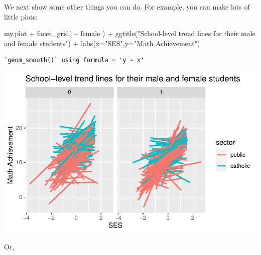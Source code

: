 \documentclass[
  letterpaper,
  DIV=11,
  numbers=noendperiod]{scrreprt}
\newenvironment{Shaded}{}{}
\newcommand{\AttributeTok}[1]{\textcolor[rgb]{0.49,0.56,0.16}{#1}}
\newcommand{\FunctionTok}[1]{\textcolor[rgb]{0.02,0.16,0.49}{#1}}
\newcommand{\NormalTok}[1]{#1}
\newcommand{\SpecialCharTok}[1]{\textcolor[rgb]{0.25,0.44,0.63}{#1}}
\newcommand{\StringTok}[1]{\textcolor[rgb]{0.25,0.44,0.63}{#1}}
\begin{document}
We next show some other things you can do. For example, you can make
lots of little plots:

\begin{Shaded}
\begin{Highlighting}[]
\NormalTok{my.plot }\SpecialCharTok{+} 
  \FunctionTok{facet\_grid}\NormalTok{( }\SpecialCharTok{\textasciitilde{}}\NormalTok{ female ) }\SpecialCharTok{+} 
    \FunctionTok{ggtitle}\NormalTok{(}\StringTok{"School{-}level trend lines for their male and female students"}\NormalTok{) }\SpecialCharTok{+}
    \FunctionTok{labs}\NormalTok{(}\AttributeTok{x=}\StringTok{"SES"}\NormalTok{,}\AttributeTok{y=}\StringTok{"Math Achievement"}\NormalTok{) }
\end{Highlighting}
\end{Shaded}

\begin{verbatim}
`geom_smooth()` using formula = 'y ~ x'
\end{verbatim}

\includegraphics{intro_ggplot_files/figure-pdf/unnamed-chunk-7-1.pdf}

Or,
\end{document}
